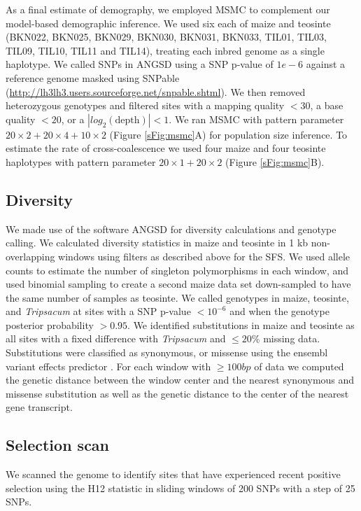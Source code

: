 \documentclass[12pt,a4paper]{article}
\begin{document}
As a final estimate of demography, we employed MSMC \cite{schiffels2014}  to complement our model-based demographic inference. 
We used six each of maize and teosinte (BKN022, BKN025, BKN029, BKN030, BKN031, BKN033, TIL01, TIL03, TIL09, TIL10, TIL11 and TIL14), treating each inbred genome as a single haplotype.
We called SNPs in ANGSD \cite{korneliussen2014} using a SNP p-value of $1e-6$ against a reference genome masked using SNPable (\url{http://lh3lh3.users.sourceforge.net/snpable.shtml}). 
We then removed heterozygous genotypes and filtered sites with a mapping quality $<30$, a base quality $<20$, or a $|\textit{log}_2(\text{depth})|<1$.
We ran MSMC with pattern parameter $20\times2+20\times4+10\times2$ (Figure \ref{sFig:msmc}A) for population size inference. To estimate the rate of cross-coalescence we used four maize and four teosinte haplotypes with pattern parameter $20\times1 + 20\times2$ (Figure \ref{sFig:msmc}B).

\subsection*{Diversity}
We made use of the software ANGSD \cite{korneliussen2014} for diversity calculations and genotype calling. 
We calculated diversity statistics in maize and teosinte in 1 kb non-overlapping windows using filters as described above for the SFS. 
We used allele counts to estimate the number of singleton polymorphisms in each window, and used binomial sampling to create a second maize data set down-sampled to have the same number of samples as teosinte.
We called genotypes in maize, teosinte, and \textit{ Tripsacum} at sites with a SNP p-value $<10^{-6}$ and when the genotype posterior probability $>0.95$. 
We identified substitutions in maize and teosinte as all sites with a fixed difference with \textit{Tripsacum} and $\leq 20\%$ missing data. 
Substitutions were classified as synonymous, or missense using the ensembl variant effects predictor \cite{mclaren2010}.
For each window with $\geq 100bp$ of data we computed the genetic distance between the window center and the nearest synonymous and missense substitution as well as the genetic distance to the center of the nearest gene transcript.  

\subsection*{Selection scan}
We scanned the genome to identify sites that have experienced recent positive selection using the H12 statistic \cite{garud2015} in sliding windows of 200 SNPs with a step of 25 SNPs.
\end{document}
